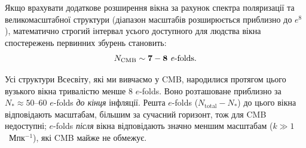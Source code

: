 Якщо врахувати додаткове розширення вікна за рахунок спектра поляризації та великомасштабної структури (діапазон масштабів розширюється приблизно до $e^8$), математично строгий інтервал усього доступного для людства вікна спостережень первинних збурень становить:
\begin{equation}
N_{\mathrm{CMB}} \sim \mathbf{7 - 8 \text{ \textit{e}-folds}}.
\end{equation}

Усі структури Всесвіту, які ми вивчаємо у CMB, народилися протягом цього вузького вікна тривалістю менше 8 $e$-folds. Воно розташоване приблизно за $N_*\approx 50$--$60$ $e$-folds \emph{до кінця} інфляції. Решта $e$-folds ($N_{\mathrm{total}}-N_*$) до цього вікна відповідають масштабам, більшим за сучасний горизонт, тож для CMB недоступні; $e$-folds \emph{після} вікна відповідають значно меншим масштабам ($k\gg 1$~Мпк$^{-1}$), які CMB майже не обмежує.